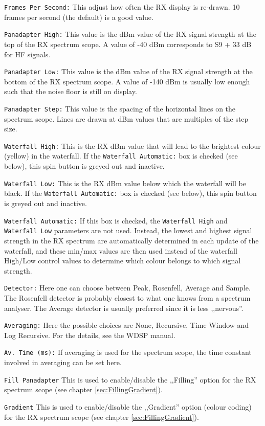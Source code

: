 \documentclass[12pt]{book}
\def\rett#1{\texttt{\color{red}#1}}
\begin{document}
\rett{Frames Per Second:} This adjust how often the RX display is re-drawn.
10 frames per second (the default) is a good value.

\rett{Panadapter High:} This value is the dBm value of the RX signal strength at the
top of the RX spectrum scope. A value of -40 dBm corresponds to S9 + 33 dB for HF
signals.

\rett{Panadapter Low:} This value is the dBm value of the RX signal strength at the
bottom of the RX spectrum scope. A value of -140 dBm is usually low enough such that
the noise floor is still on display.

\rett{Panadapter Step:} This value is the spacing of the horizontal lines on
the spectrum scope. Lines are drawn at dBm values that are multiples of the step
size.

\rett{Waterfall High:} This is the RX dBm value that will lead to the brightest
colour (yellow) in the waterfall. If the \rett{Waterfall Automatic:} box is checked
(see below), this spin button is greyed out and inactive.

\rett{Waterfall Low:} This is the RX dBm value below which the waterfall will be black.
If the \rett{Waterfall Automatic:} box is checked
(see below), this spin button is greyed out and inactive.

\rett{Waterfall Automatic:} If this box is checked, the \rett{Waterfall High} and
\rett{Waterfall Low} parameters are not used. Instead,
the lowest and highest signal strength in the RX spectrum are automatically determined
in each update of the waterfall, and these min/max values
are then used instead of the waterfall High/Low control values to determine which
colour belongs to which signal strength.

\rett{Detector:} Here one can choose between Peak, Rosenfell, Average and Sample. The
Rosenfell detector is probably closest to what one knows from a spectrum analyser.
The Average detector is usually preferred since it is less ,,nervous''.

\rett{Averaging:} Here the possible choices are None, Recursive, Time Window and
Log Recursive. For the details, see the WDSP manual.

\rett{Av. Time (ms):} If averaging is used for the spectrum scope, the time
constant involved in averaging can be set here.

\rett{Fill Panadapter} This is used to enable/disable the ,,Filling'' option
for the RX  spectrum scope (see chapter \ref{sec:FillingGradient}).

\rett{Gradient} This is used to enable/disable the ,,Gradient'' option
(colour coding) for the RX spectrum scope (see chapter \ref{sec:FillingGradient}).
\end{document}

